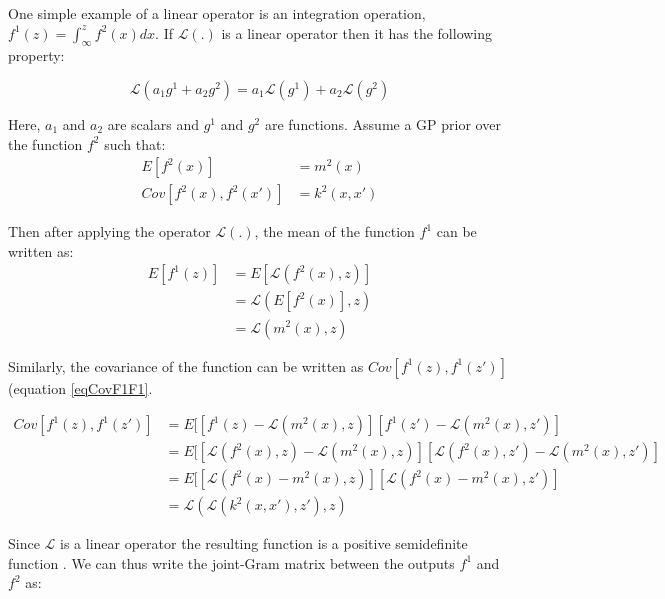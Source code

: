 One simple example of a linear operator is an integration operation, $f^1(z) = \int_{\infty}^z f^2(x)dx$. If $\mathcal{L} (.)$ is a linear operator then it has the following property:

\begin{equation}
    \mathcal{L} (a_1g^1 + a_2g^2) = a_1\mathcal{L}(g^1) + a_2\mathcal{L}(g^2) 
\end{equation}

Here, $a_1$ and $a_2$ are scalars and $g^1$ and $g^2$ are functions. Assume a GP prior over the function $f^2$ such that:
\begin{align}
E[f^2(x)] & = m^2(x) \\
Cov[f^2(x), f^2(x')] & = k^2(x, x')
\end{align}

Then after applying the operator $\mathcal{L}(.)$, the mean of the function $f^1$ can be written as:
\begin{equation}
\begin{aligned}
E[f^1(z)]   & = E[\mathcal{L}\left ( f^{2}(x), z \right )] \\
            & = \mathcal{L}(E[f^{2}(x)], z) \\
            & = \mathcal{L}(m^2(x), z)
\end{aligned}
\end{equation}

Similarly, the covariance of the function can be written as $Cov[f^1(z), f^1(z')]$ (equation \ref{eqCovF1F1}. 

\begin{equation}\label{eqCovF1F1}
\begin{aligned}
Cov[f^1(z), f^1(z')]   & = E[[f^{1}(z) - \mathcal{L}(m^2(x), z)][f^{1}(z') - \mathcal{L}(m^2(x), z')] \\
            & = E[[\mathcal{L}\left ( f^{2}(x), z \right ) - \mathcal{L}(m^2(x), z)][\mathcal{L}\left ( f^{2}(x), z' \right ) - \mathcal{L}(m^2(x), z')] \\ 
            & = E[[\mathcal{L}\left ( f^{2}(x) - m^2(x) , z \right )][\mathcal{L}\left ( f^{2}(x) - m^2(x), z' \right )] \\
            & = \mathcal{L}\left(\mathcal{L}\left(k^2(x, x'), z'\right) , z\right)
\end{aligned}
\end{equation}

Since $\mathcal{L}$ is a linear operator the resulting function is a positive semidefinite function \cite{ginsbourger2013invariances, sarkka2011linear}. We can thus write the joint-Gram matrix between the outputs $f^1$ and $f^2$ as:

